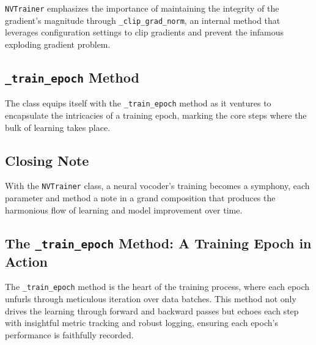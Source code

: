 \documentclass[a4paper]{article}
\begin{document}
\texttt{NVTrainer} emphasizes the importance of maintaining the integrity of the gradient's magnitude through \texttt{\_clip\_grad\_norm}, an internal method that leverages configuration settings to clip gradients and prevent the infamous exploding gradient problem.

\subsection{\texttt{\_train\_epoch} Method}

The class equips itself with the \texttt{\_train\_epoch} method as it ventures to encapsulate the intricacies of a training epoch, marking the core steps where the bulk of learning takes place.

\subsection{Closing Note}

With the \texttt{NVTrainer} class, a neural vocoder's training becomes a symphony, each parameter and method a note in a grand composition that produces the harmonious flow of learning and model improvement over time.




\subsection{The \texttt{\_train\_epoch} Method: A Training Epoch in Action}

The \texttt{\_train\_epoch} method is the heart of the training process, where each epoch unfurls through meticulous iteration over data batches. This method not only drives the learning through forward and backward passes but echoes each step with insightful metric tracking and robust logging, ensuring each epoch's performance is faithfully recorded.
\end{document}
